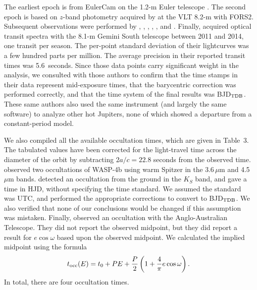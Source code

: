 \documentclass[12pt,twocolumn,tighten]{aastex62}
\begin{document}
The earliest epoch is from EulerCam on the 1.2-m Euler telescope
\citep{wilson_wasp-4b_2008}.  The second epoch is based on $z$-band
photometry acquired by \citet{gillon_improved_2009} at the VLT 8.2-m
with FORS2.  Subsequent observations were performed by
\citet{winn_transit_2009}, \citet{dragomir_terms_2011},
\citet{sanchis-ojeda_starspots_2011}, \citet{nikolov_wasp-4b_2012},
\citet{hoyer_tramos_2013}, and \citet{ranjan_atmospheric_2014}.
Finally, \citet{huitson_gemini_2017} acquired optical transit spectra
with the 8.1-m Gemini South telescope between 2011 and 2014, one
transit per season.  The per-point standard deviation of their
lightcurves was a few hundred parts per million.  The average
precision in their reported transit times was 5.6~seconds.  Since
those data points carry significant weight in the analysis, we
consulted with those authors to confirm that the time stamps in their
data represent mid-exposure times, that the barycentric correction was
performed correctly, and that the time system of the final results was
BJD$_{\rm TDB}$.  These same authors also used the same instrument
(and largely the same software) to analyze other hot Jupiters, none of
which showed a departure from a constant-period model.

We also compiled all the available occultation times, which are given
in Table~3.  The tabulated values have been corrected for the
light-travel time across the diameter of the orbit by subtracting
$2a/c = 22.8$ seconds from the observed time.
\citet{beerer_secondary_2011} observed two occultations of WASP-4b
using warm Spitzer in the 3.6\,$\mu$m and 4.5\,$\mu$m bands.
\citet{caceres_ground-based_2011} detected an occultation from the
ground in the $K_S$ band, and gave a time in HJD, without specifying
the time standard.  We assumed the standard was UTC, and performed the
appropriate corrections to convert to BJD$_{\rm TDB}$.  We
also verified that none of our conclusions would be changed if this
assumption was mistaken. Finally, \citet{zhou_secondary_2015} observed an
occultation with the Anglo-Australian Telescope.  They did not
report the observed midpoint, but they did report a result for
$e\cos\omega$ based upon the observed midpoint.  We calculated the
implied midpoint using the formula \citep[{\it
e.g.},][]{winn_exoplanet_2010}
\begin{equation}
  t_{\rm occ}(E) =
  t_0 +  P E  +
  \frac{P}{2} \left( 1 + \frac{4}{\pi} e\cos\omega \right).
  \label{eq:occultation_time}
\end{equation}
In total, there are four occultation times.
\end{document}
